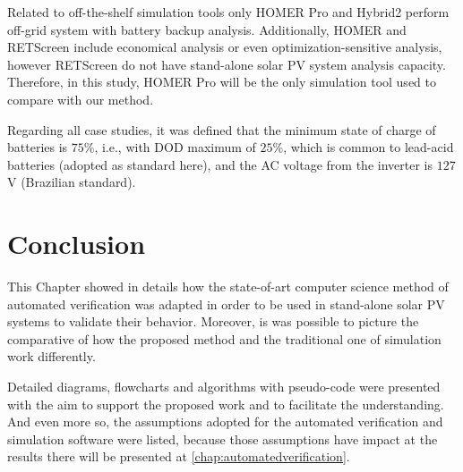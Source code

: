 Related to off-the-shelf simulation tools only HOMER Pro and Hybrid2 perform off-grid system with battery backup analysis. Additionally, HOMER and RETScreen include economical analysis or even optimization-sensitive analysis, however RETScreen do not have stand-alone solar PV system analysis capacity. Therefore, in this study, HOMER Pro will be the only simulation tool used to compare with our method.  

Regarding all case studies, it was defined that the minimum state of charge of batteries is $75$\%, i.e., with DOD maximum of $25$\%, which is common to lead-acid batteries (adopted as standard here), and the AC voltage from the inverter is $127$ V (Brazilian standard).


\section{Conclusion}

This Chapter showed in details how the state-of-art computer science method of automated verification was adapted in order to be used in stand-alone solar PV systems to validate their behavior. Moreover, is was possible to picture the comparative of how the proposed method and the traditional one of simulation work differently.

Detailed diagrams, flowcharts and algorithms with pseudo-code were presented with the aim to support the proposed work and to facilitate the understanding. And even more so, the assumptions adopted for the automated verification and simulation software were listed, because those assumptions have impact at the results there will be presented at \autoref{chap:automatedverification}.


